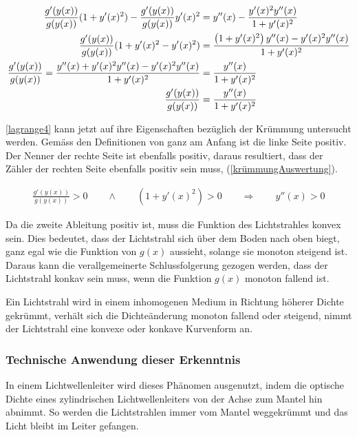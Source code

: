 \begin{align}
	\frac{g'(y(x))}{g(y(x))} (1 + y'(x)^2) - \frac{g'(y(x))}{g(y(x))} y'(x)^2 &=  y''(x) - \frac{y'(x)^2 y''(x)}{1 + y'(x)^2} \notag \\
	\frac{g'(y(x))}{g(y(x))} (1 + y'(x)^2 - y'(x)^2) &= \frac{\left(1 + y'(x)^2 \right)y''(x) - y'(x)^2 y''(x)}{1 + y'(x)^2} \notag \\
	\frac{g'(y(x))}{g(y(x))} = \frac{y''(x) + y'(x)^2 y''(x) - y'(x)^2 y''(x)}{1 + y'(x)^2} &= \frac{y''(x)}{1 + y'(x)^2}\notag \\
	\frac{g'(y(x))}{g(y(x))} &= \frac{y''(x)}{1 + y'(x)^2}
	\label{lagrange4}
\end{align}


\eqref{lagrange4} kann jetzt auf ihre Eigenschaften bezüglich der Krümmung untersucht werden. Gemäss den Definitionen von ganz am Anfang ist die linke Seite positiv. 
Der Nenner der rechte Seite ist ebenfalls positiv, daraus resultiert, dass der Zähler der rechten Seite ebenfalls positiv sein muss, (\eqref{krümmungAuswertung}).

\begin{align}
	\frac{g'(y(x))}{g(y(x))} > 0 \qquad \wedge \qquad (1 + y'(x)^2) > 0 \qquad \Rightarrow \qquad y''(x) > 0
	\label{krümmungAuswertung}
\end{align}

Da die zweite Ableitung positiv ist, muss die Funktion des Lichtstrahles konvex sein.
Dies bedeutet, dass der Lichtstrahl sich über dem Boden nach oben biegt, ganz egal wie die Funktion von $g(x)$ aussieht, solange sie monoton steigend ist.
Daraus kann die verallgemeinerte Schlussfolgerung gezogen werden, dass der Lichtstrahl konkav sein muss, wenn die Funktion $g(x)$ monoton fallend ist.
\begin{hilfssatz}
Ein Lichtstrahl wird in einem inhomogenen Medium in Richtung höherer Dichte gekrümmt, verhält sich die Dichteänderung monoton fallend oder steigend, nimmt der Lichtstrahl eine konvexe oder konkave Kurvenform an.
\end{hilfssatz}

\subsubsection{Technische Anwendung dieser Erkenntnis}
In einem Lichtwellenleiter wird dieses Phänomen ausgenutzt, 
indem  die  optische  Dichte  eines  zylindrischen
Lichtwellenleiters  von  der Achse zum Mantel hin abnimmt.
So werden die Lichtstrahlen immer vom Mantel weggekrümmt 
und das Licht  bleibt im Leiter gefangen.

